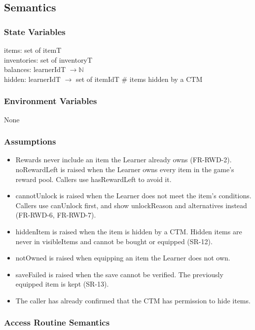 \documentclass[12pt, titlepage]{article}
\begin{document}
\subsection{Semantics}

\subsubsection{State Variables}

items: set of itemT \\
inventories: set of inventoryT \\
balances: learnerIdT $\rightarrow \mathbb{N}$ \\
hidden: learnerIdT $\rightarrow$ set of itemIdT \# items hidden by a CTM

\subsubsection{Environment Variables}

None

\subsubsection{Assumptions}

\begin{itemize}
\item Rewards never include an item the Learner already owns (FR-RWD-2).
  noRewardLeft is raised when the Learner owns every item in the game's reward
  pool. Callers use hasRewardLeft to avoid it.
\item cannotUnlock is raised when the Learner does not meet the item's
  conditions. Callers use canUnlock first, and show unlockReason and
  alternatives instead (FR-RWD-6, FR-RWD-7).
\item hiddenItem is raised when the item is hidden by a CTM. Hidden items are
  never in visibleItems and cannot be bought or equipped (SR-12).
\item notOwned is raised when equipping an item the Learner does not own.
\item saveFailed is raised when the save cannot be verified. The previously
  equipped item is kept (SR-13).
\item The caller has already confirmed that the CTM has permission to hide items.
\end{itemize}

\subsubsection{Access Routine Semantics}
\end{document}
